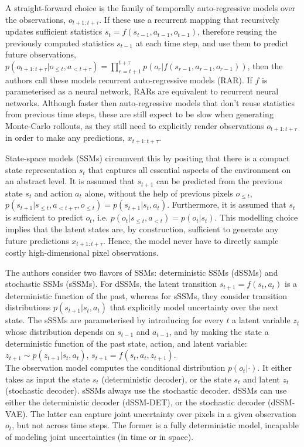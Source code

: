 A straight-forward choice is the family of temporally auto-regressive models over the observations, $o_{t+1:t+\tau}$. If these use a recurrent mapping that recursively updates sufficient statistics $s_t = f(s_{t−1}, a_{t−1}, o_{t−1})$, therefore reusing the previously computed statistics $s_{t-1}$ at each time step, and use them to predict future observations, $p(o_{t+1:t+\tau} | o_{\leqslant t}, a_{<t+\tau}) = \prod^{t+\tau}_{r=t+1} p(o_r | f(s_{r−1}, a_{r−1}, o_{r−1}))$, then the authors call these models recurrent auto-regressive models (RAR). If $f$ is parameterised as a neural network, RARs are equivalent to recurrent neural networks. Although faster then auto-regressive models that don't reuse statistics from previous time steps, these are still expect to be slow when generating Monte-Carlo rollouts, as they still need to explicitly render observations $o_{t+1:t+\tau}$ in order to make any predictions, $x_{t+1:t+\tau}$.

State-space models (SSMs) circumvent this by positing that there is a compact state representation $s_t$ that captures all essential aspects of the environment on an abstract level. It is assumed that $s_{t+1}$ can be predicted from the previous state $s_t$ and action $a_t$ alone, without the help of previous pixels $o_{\leqslant t}$, $p(s_{t+1}|s_{\leqslant t}, a_{<t+\tau}, o_{\leqslant t}) = p(s_{t+1}| s_t, a_t)$. Furthermore, it is assumed that $s_t$ is sufficient to predict $o_t$, i.e. $p(o_t|s_{\leqslant t}, a_{<t}) = p(o_t|s_t)$. This modelling choice implies that the latent states are, by construction, sufficient to generate any future predictions $x_{t+1:t+\tau}$. Hence, the model never have to directly sample costly high-dimensional pixel observations.

The authors consider two flavors of SSMs: deterministic SSMs (dSSMs) and stochastic SSMs (sSSMs). For dSSMs, the latent transition $s_{t+1} = f(s_t, a_t)$ is a deterministic function of the past, whereas for sSSMs, they consider transition distributions $p(s_{t+1}|s_t, a_t)$ that explicitly model uncertainty over the next state. The sSSMs are parameterised by introducing for every $t$ a latent variable $z_t$ whose distribution depends on $s_{t−1}$ and $a_{t−1}$, and by making the state a deterministic function of the past state, action, and latent variable: $z_{t+1} \sim p(z_{t+1}|s_t, a_t)$, $s_{t+1} = f(s_t, a_t, z_{t+1})$. \\
The observation model computes the conditional distribution $p(o_t|\cdot)$. It either takes as input the state $s_t$ (deterministic decoder), or the state $s_t$ and latent $z_t$ (stochastic decoder). sSSMs always use the stochastic decoder. dSSMs can use either the deterministic decoder (dSSM-DET), or the stochastic decoder (dSSM-VAE). The latter can capture joint uncertainty over pixels in a given observation $o_t$, but not across time steps. The former is a fully deterministic model, incapable of modeling joint uncertainties (in time or in space).

